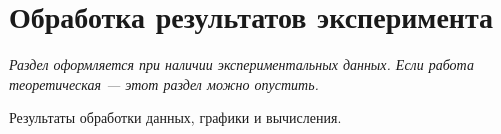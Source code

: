 \section*{Обработка результатов эксперимента}
\textit{Раздел оформляется при наличии экспериментальных данных. Если работа теоретическая — этот раздел можно опустить.}

Результаты обработки данных, графики и вычисления.
